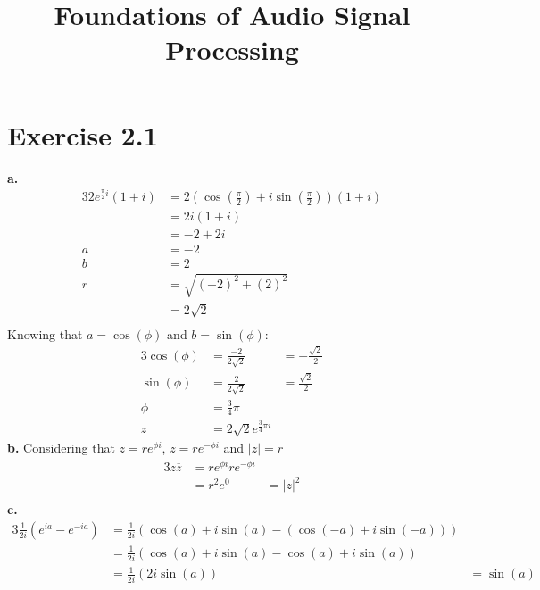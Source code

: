 \documentclass[12pt]{article}
\title{Foundations of Audio Signal Processing\\ \ass}
\author{\auth}
\begin{document}
	\maketitle
	\section*{Exercise 2.1}
	\textbf{a.}
	\begin{alignat*}{3}
		2e^{\frac{\pi}{2} i} (1 + i) &= 2 (\cos(\frac{\pi}{2}) + i\sin(\frac{\pi}{2}))(1 + i)\\
		&= 2i (1 + i)\\
		&= -2 + 2i\\
		a &= -2\\
		b &= 2\\
		r &= \sqrt{(-2)^2 + (2)^2}\\
		&= 2\sqrt{2}\\ 
	\end{alignat*}
	Knowing that $a = \cos(\phi)$ and $b = \sin(\phi)$:
	\begin{alignat*}{3}
	\cos(\phi) &= \frac{-2}{2\sqrt{2}} &= -\frac{\sqrt{2}}{2}\\
	\sin(\phi) &= \frac{2}{2\sqrt{2}} &= \frac{\sqrt{2}}{2}\\
	\phi &= \frac{3}{4}\pi\\
	z &= 2 \sqrt{2} e^{\frac{3}{4}\pi i}
	\end{alignat*}
	\textbf{b.} Considering that $z = re^{\phi i}$, $\overline{z} = re^{-\phi i}$ and $|z| = r$
	\begin{alignat*}{3}
	z \overline{z} &= re^{\phi i} re^{- \phi i}\\
	&= r^2 e^0 &= |z|^2\\
	\end{alignat*}
	\textbf{c.}
	\begin{alignat*}{3}
	\frac{1}{2i} (e^{ia} - e^{-ia}) &= \frac{1}{2i} (\cos(a) + i \sin(a) - (\cos(-a) + i \sin(-a)))\\
	&= \frac{1}{2i} (\cos(a) + i \sin(a) - \cos(a) + i \sin(a))\\
	&= \frac{1}{2i} (2 i \sin(a)) &= \sin(a)
	\end{alignat*}
\end{document}
